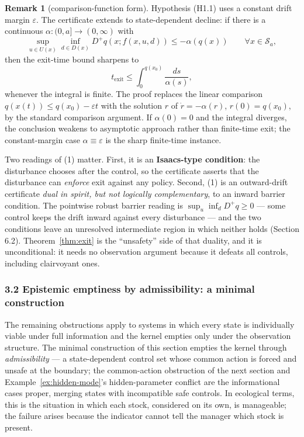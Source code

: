 \documentclass[11pt]{article}
\theoremstyle{definition}
\newtheorem{remark}{Remark}
\begin{document}
\begin{remark}[comparison-function form]\label{rem:comparison}
Hypothesis (H1.1) uses a constant drift margin \(\varepsilon\). The
certificate extends to state-dependent decline: if there is a continuous
\(\alpha:(0,a]\to(0,\infty)\) with
\[\sup_{u\in U(x)}\inf_{d\in D(x)} D^+q(x; f(x,u,d)) \le -\alpha(q(x)) \qquad \forall x\in\mathcal{S}_a,\]
then the exit-time bound sharpens to
\[t_{\mathrm{exit}} \le \int_0^{q(x_0)} \frac{ds}{\alpha(s)},\]
whenever the integral is finite. The proof replaces the linear comparison
\(q(x(t))\le q(x_0)-\varepsilon t\) with the solution \(r\) of
\(\dot r=-\alpha(r)\), \(r(0)=q(x_0)\), by the standard comparison
argument. If \(\alpha(0)=0\) and the integral diverges, the conclusion
weakens to asymptotic approach rather than finite-time exit; the
constant-margin case \(\alpha\equiv\varepsilon\) is the sharp finite-time
instance.
\end{remark}

Two readings of (1) matter. First, it is an \textbf{Isaacs-type
condition}: the disturbance chooses after the control, so the
certificate asserts that the disturbance can \emph{enforce} exit against
any policy. Second, (1) is an outward-drift certificate \emph{dual in
spirit, but not logically complementary}, to an inward barrier
condition. The pointwise robust barrier reading is
\(\sup_u \inf_d D^+ q \ge 0\) --- some control keeps the drift inward
against every disturbance --- and the two conditions leave an unresolved
intermediate region in which neither holds (Section 6.2). Theorem~\ref{thm:exit} is
the ``unsafety'' side of that duality, and it is unconditional: it needs
no observation argument because it defeats all controls, including
clairvoyant ones.

\subsubsection{3.2 Epistemic emptiness by admissibility: a minimal
construction}\label{epistemic-emptiness-by-admissibility-a-minimal-construction}

The remaining obstructions apply to systems in which every state is
individually viable under full information and the kernel empties only under the observation structure.
The minimal construction of this section empties the kernel through
\emph{admissibility} --- a state-dependent control set whose common
action is forced and unsafe at the boundary; the common-action
obstruction of the next section and Example~\ref{ex:hidden-mode}'s hidden-parameter
conflict are the informational cases proper, merging states with
incompatible safe controls. In ecological terms, this is the situation
in which each stock, considered on its own, is manageable; the failure
arises because the indicator cannot tell the manager which stock is
present.
\end{document}
